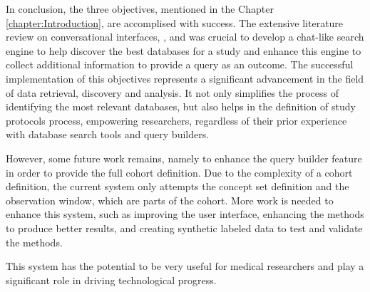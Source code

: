 In conclusion, the three objectives, mentioned in the Chapter \ref{chapter:Introduction}, are accomplised with success. The extensive literature review on conversational interfaces, {\nlp}, and {\ir} was crucial to develop a chat-like search engine to help discover the best databases for a study and enhance this engine to collect additional information to provide a query as an outcome. The successful implementation of this objectives represents a significant advancement in the field of data retrieval, discovery and analysis. It not only simplifies the process of identifying the most relevant databases, but also helps in the definition of study protocols process, empowering researchers, regardless of their prior experience with database search tools and query builders.

However, some future work remains, namely to enhance the query builder feature in order to provide the full cohort definition. Due to the complexity of a cohort definition, the current system only attempts the concept set definition and the observation window, which are parts of the cohort. More work is needed to enhance this system, such as improving the user interface, enhancing the {\ir} methods to produce better results, and creating synthetic labeled data to test and validate the {\ir} methods.

This system has the potential to be very useful for medical researchers and play a significant role in driving technological progress.
 

